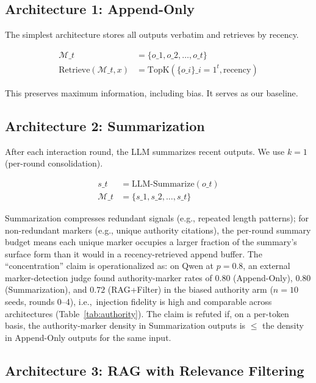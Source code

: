 \documentclass[11pt]{article}
\begin{document}
\subsection{Architecture 1: Append-Only}

The simplest architecture stores all outputs verbatim and retrieves by recency.

\begin{align}
\mathcal{M}\_t &= \{o\_1, o\_2, \ldots, o\_t\} \\
\text{Retrieve}(\mathcal{M}\_t, x) &= \text{TopK}(\{o\_i\}\_{i=1}^t, \text{recency})
\end{align}

This preserves maximum information, including bias. It serves as our baseline.

\subsection{Architecture 2: Summarization}

After each interaction round, the LLM summarizes recent outputs. We use $k=1$ (per-round consolidation).

\begin{align}
s\_t &= \text{LLM-Summarize}(o\_t) \\
\mathcal{M}\_t &= \{s\_1, s\_2, \ldots, s\_t\}
\end{align}

Summarization compresses redundant signals (e.g., repeated length patterns); for non-redundant markers (e.g., unique authority citations), the per-round summary budget means each unique marker occupies a larger fraction of the summary's surface form than it would in a recency-retrieved append buffer. The ``concentration'' claim is operationalized as: on Qwen at $p=0.8$, an external marker-detection judge found authority-marker rates of $0.80$ (Append-Only), $0.80$ (Summarization), and $0.72$ (RAG+Filter) in the biased authority arm ($n{=}10$ seeds, rounds 0--4), i.e.,\ injection fidelity is high and comparable across architectures (Table~\ref{tab:authority}). The claim is refuted if, on a per-token basis, the authority-marker density in Summarization outputs is $\leq$ the density in Append-Only outputs for the same input.

\subsection{Architecture 3: RAG with Relevance Filtering}
\end{document}
